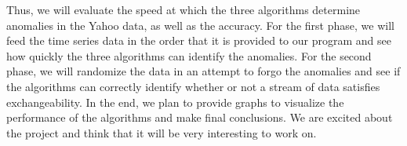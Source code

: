 \documentclass[11pt, margin=1in]{article}
\begin{document}
Thus, we will evaluate the speed at which the three algorithms determine anomalies in the Yahoo data, as well as the accuracy.  For the first phase, we will feed the time series data in the order that it is provided to our program and see how quickly the three algorithms can identify the anomalies.  For the second phase, we will randomize the data in an attempt to forgo the anomalies and see if the algorithms can correctly identify whether or not a stream of data satisfies exchangeability.  In the end, we plan to provide graphs to visualize the performance of the algorithms and make final conclusions.  We are excited about the project and think that it will be very interesting to work on.     
\end{document}
